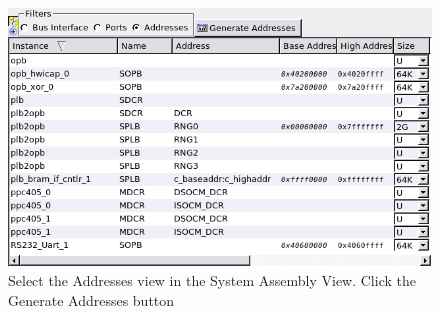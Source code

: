 \documentclass[a4paper,oneside]{memoir}
\begin{document}
\begin{figure}[H]
\centering
\includegraphics[scale=0.5]{AXOR3}
\caption{Select the Addresses view in the System Assembly View. Click the Generate Addresses button\label{fig:AXOR3}}
\end{figure}
\end{document}
